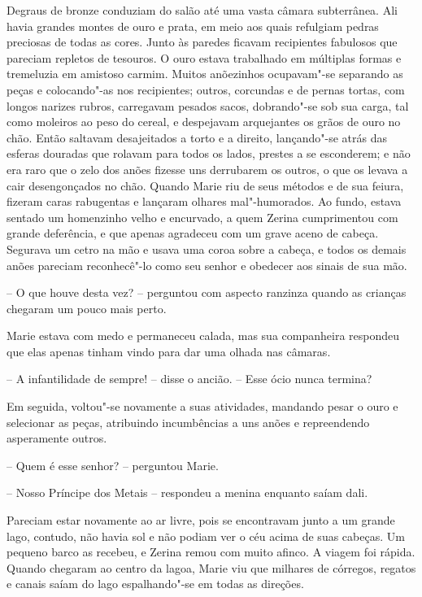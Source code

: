 Degraus de bronze conduziam do salão até uma vasta câmara subterrânea.
Ali havia grandes montes de ouro e prata, em meio aos quais refulgiam
pedras preciosas de todas as cores. Junto às paredes ficavam
recipientes fabulosos que pareciam repletos de tesouros. O ouro estava
trabalhado em múltiplas formas e tremeluzia em amistoso carmim. 
Muitos anõezinhos ocupavam"-se separando as peças e
colocando"-as nos recipientes; outros, corcundas e de pernas tortas, com
longos narizes rubros, carregavam pesados sacos, dobrando"-se sob sua
carga, tal como moleiros ao peso do cereal, e despejavam arquejantes os
grãos de ouro no chão. Então saltavam desajeitados a torto e a direito,
lançando"-se atrás das esferas douradas que rolavam para todos os lados,
prestes a se esconderem; e não era raro que o zelo dos anões fizesse
uns derrubarem os outros, o que os levava a cair desengonçados no chão. 
Quando Marie riu de seus métodos e de sua feiura, fizeram caras rabugentas 
e lançaram olhares mal"-humorados. Ao fundo, estava sentado um
homenzinho velho e encurvado, a quem Zerina cumprimentou com grande
deferência, e que apenas agradeceu com um grave aceno de cabeça.
Segurava um cetro na mão e usava uma coroa sobre a cabeça, e todos os
demais anões pareciam reconhecê"-lo como seu senhor e obedecer aos
sinais de sua mão.

-- O que houve desta vez? -- perguntou com aspecto ranzinza
quando as crianças chegaram um pouco mais perto. 

Marie estava com medo e permaneceu calada, mas sua companheira respondeu
que elas apenas tinham vindo para dar uma olhada nas câmaras.

-- A infantilidade de sempre! -- disse o ancião. -- Esse ócio nunca
termina?

Em seguida, voltou"-se novamente a suas atividades, mandando pesar o
ouro e selecionar as peças, \mbox{atribuindo} incumbências a uns anões e
repreendendo asperamente outros.

-- Quem é esse senhor? -- perguntou Marie.

-- Nosso Príncipe dos Metais -- respondeu a menina enquanto saíam dali.

Pareciam estar novamente ao ar livre, pois se encontravam junto a um
grande lago, contudo, não havia sol e não podiam ver o céu acima de
suas cabeças. Um pequeno barco as recebeu, e Zerina remou com muito
afinco. A viagem foi rápida. Quando chegaram ao centro da lagoa, Marie
viu que milhares de córregos, regatos e canais saíam do lago
espalhando"-se em todas as direções.

